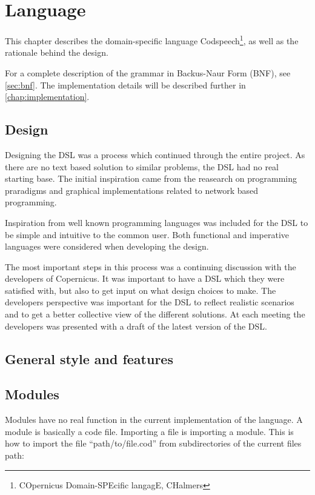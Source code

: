 \chapter{Language}\label{chap:language}
This chapter describes the domain-specific language
Codspeech\footnote{COpernicus Domain-SPEcific langagE, CHalmers}, as
well as the rationale behind the design.

For a complete description of the grammar in Backus-Naur Form (BNF),
see \autoref{sec:bnf}. The implementation details will be described
further in \autoref{chap:implementation}.


\section{Design}
Designing the DSL was a process which continued through the entire
project. As there are no text based solution to similar problems, the
DSL had no real starting base. The initial inspiration came from the
reasearch on programming praradigms and graphical implementations
related to network based programming.

Inspiration from well known programming languages was included for the
DSL to be simple and intuitive to the common user. Both functional and
imperative languages were considered when developing the design.

The most important steps in this process was a continuing discussion
with the developers of Copernicus. It was important to have a DSL
which they were satisfied with, but also to get input on what design
choices to make. The developers perspective was important for the DSL
to reflect realistic scenarios and to get a better collective view of
the different solutions. At each meeting the developers was presented
with a draft of the latest version of the DSL.

\section{General style and features}





\section{Modules}
Modules have no real function in the current implementation of the
language. A module is basically a code file. Importing a file is
importing a module. This is how to import the file
``path/to/file.cod'' from subdirectories of the current files path:

